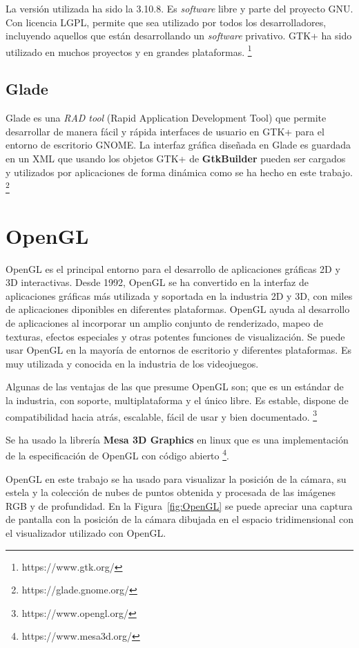 La versión utilizada ha sido la 3.10.8. Es \textit{software} libre y parte del proyecto GNU. Con licencia LGPL, permite que sea utilizado por todos los desarrolladores, incluyendo aquellos que están desarrollando un  \textit{software} privativo. GTK+ ha sido utilizado en muchos proyectos y en grandes plataformas. \footnote{https://www.gtk.org/}

\subsection{Glade}
Glade es una \textit{RAD tool} (Rapid Application Development Tool) que permite desarrollar de manera fácil y rápida interfaces de usuario en GTK+ para el entorno de escritorio GNOME. La interfaz gráfica diseñada en Glade es guardada en un XML que usando los objetos GTK+ de \textbf{GtkBuilder} pueden ser cargados y utilizados por aplicaciones de forma dinámica como se ha hecho en este trabajo. \footnote{https://glade.gnome.org/}
\section{OpenGL}
OpenGL es el principal entorno para el desarrollo de aplicaciones gráficas 2D y 3D interactivas. Desde 1992, OpenGL se ha convertido en la interfaz de aplicaciones gráficas más utilizada y soportada en la industria 2D y 3D, con miles de aplicaciones diponibles en diferentes plataformas. OpenGL ayuda al desarrollo de aplicaciones al incorporar un amplio conjunto de renderizado, mapeo de texturas, efectos especiales y otras potentes funciones de visualización. Se puede usar OpenGL en la mayoría de entornos de escritorio y diferentes plataformas. Es muy utilizada y conocida en la industria de los videojuegos.

Algunas de las ventajas de las que presume OpenGL son; que es un estándar de la industria, con soporte, multiplataforma y el único libre. Es estable, dispone de compatibilidad hacia atrás, escalable, fácil de usar y bien documentado. \footnote{https://www.opengl.org/}

Se ha usado la librería \textbf{Mesa 3D Graphics} en linux que es una implementación de la especificación de OpenGL con código abierto \footnote{https://www.mesa3d.org/}.

OpenGL en este trabajo se ha usado para visualizar la posición de la cámara, su estela y la colección de nubes de puntos obtenida y procesada de las imágenes RGB y de profundidad. En la Figura~\ref{fig:OpenGL} se puede apreciar una captura de pantalla con la posición de la cámara dibujada en el espacio tridimensional con el visualizador utilizado con OpenGL.

